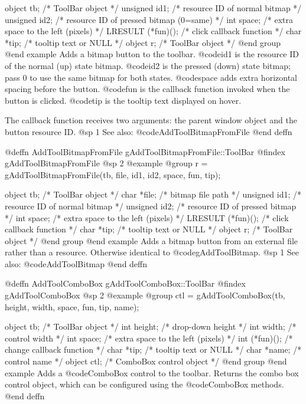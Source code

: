 object    tb;      /*  ToolBar object                     */
unsigned  id1;     /*  resource ID of normal bitmap        */
unsigned  id2;     /*  resource ID of pressed bitmap (0=same)  */
int       space;   /*  extra space to the left (pixels)    */
LRESULT   (*fun)();  /*  click callback function           */
char      *tip;    /*  tooltip text or NULL                */
object    r;       /*  ToolBar object                     */
@end group
@end example
Adds a bitmap button to the toolbar.  @code{id1} is the resource ID of
the normal (up) state bitmap.  @code{id2} is the pressed (down) state
bitmap; pass 0 to use the same bitmap for both states.  @code{space}
adds extra horizontal spacing before the button.  @code{fun} is the
callback function invoked when the button is clicked.  @code{tip} is
the tooltip text displayed on hover.

The callback function receives two arguments: the parent window object
and the button resource ID.
@sp 1
See also:  @code{AddToolBitmapFromFile}
@end deffn



@deffn {AddToolBitmapFromFile} gAddToolBitmapFromFile::ToolBar
@findex gAddToolBitmapFromFile
@sp 2
@example
@group
r = gAddToolBitmapFromFile(tb, file, id1, id2, space, fun, tip);

object    tb;      /*  ToolBar object                     */
char      *file;   /*  bitmap file path                    */
unsigned  id1;     /*  resource ID of normal bitmap        */
unsigned  id2;     /*  resource ID of pressed bitmap       */
int       space;   /*  extra space to the left (pixels)    */
LRESULT   (*fun)();  /*  click callback function           */
char      *tip;    /*  tooltip text or NULL                */
object    r;       /*  ToolBar object                     */
@end group
@end example
Adds a bitmap button from an external file rather than a resource.
Otherwise identical to @code{gAddToolBitmap}.
@sp 1
See also:  @code{AddToolBitmap}
@end deffn



@deffn {AddToolComboBox} gAddToolComboBox::ToolBar
@findex gAddToolComboBox
@sp 2
@example
@group
ctl = gAddToolComboBox(tb, height, width, space, fun, tip, name);

object  tb;      /*  ToolBar object                    */
int     height;  /*  drop-down height                   */
int     width;   /*  control width                      */
int     space;   /*  extra space to the left (pixels)   */
int     (*fun)();  /*  change callback function          */
char    *tip;    /*  tooltip text or NULL                */
char    *name;   /*  control name                       */
object  ctl;     /*  ComboBox control object             */
@end group
@end example
Adds a @code{ComboBox} control to the toolbar.  Returns the combo box
control object, which can be configured using the @code{ComboBox}
methods.
@end deffn



